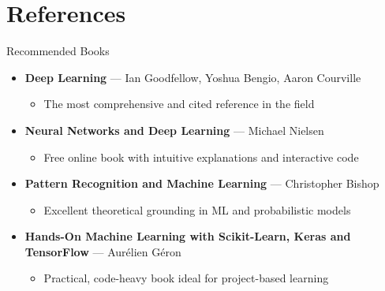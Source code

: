 \documentclass[aspectratio=169]{beamer}
\begin{document}
%
\section{References}
%
\begin{frame}{Recommended Books}

\begin{itemize}
    \item \textbf{Deep Learning} — Ian Goodfellow, Yoshua Bengio, Aaron Courville  
    \begin{itemize}
        \item The most comprehensive and cited reference in the field
    \end{itemize}

    \item \textbf{Neural Networks and Deep Learning} — Michael Nielsen  
    \begin{itemize}
        \item Free online book with intuitive explanations and interactive code
    \end{itemize}

    \item \textbf{Pattern Recognition and Machine Learning} — Christopher Bishop  
    \begin{itemize}
        \item Excellent theoretical grounding in ML and probabilistic models
    \end{itemize}
    
    \item \textbf{Hands-On Machine Learning with Scikit-Learn, Keras and TensorFlow} — Aurélien Géron  
    \begin{itemize}
        \item Practical, code-heavy book ideal for project-based learning
    \end{itemize}
\end{itemize}

\end{frame}
%
%
\end{document}
